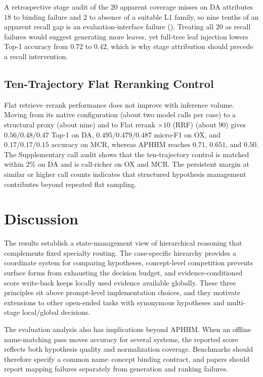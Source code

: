\documentclass[letterpaper]{article} %
\begin{document}
A retrospective stage audit of the $20$ apparent coverage misses on DA attributes $18$ to binding failure and $2$ to absence of a suitable L1 family, so nine tenths of an apparent recall gap is an evaluation-interface failure ().
Treating all $20$ as recall failures would suggest generating more leaves, yet full-tree leaf injection lowers Top-1 accuracy from $0.72$ to $0.42$, which is why stage attribution should precede a recall intervention.

\subsection{Ten-Trajectory Flat Reranking Control}
\label{sec:rq4}

Flat retrieve--rerank performance does not improve with inference volume.
Moving from its native configuration (about two model calls per case) to a structural proxy (about nine) and to Flat rerank $\times 10$ (RRF) (about $90$) gives $0.56/0.48/0.47$ Top-1 on DA, $0.495/0.479/0.487$ micro-F1 on OX, and $0.17/0.17/0.15$ accuracy on MCR, whereas APHHM reaches $0.71$, $0.651$, and $0.50$.
The Supplementary call audit shows that the ten-trajectory control is matched within $2\%$ on DA and is call-richer on OX and MCR.
The persistent margin at similar or higher call counts indicates that structured hypothesis management contributes beyond repeated flat sampling.

\section{Discussion}
\label{sec:discussion}

The results establish a state-management view of hierarchical reasoning that complements fixed specialty routing.
The case-specific hierarchy provides a coordinate system for comparing hypotheses, concept-level competition prevents surface forms from exhausting the decision budget, and evidence-conditioned score write-back keeps locally used evidence available globally.
These three principles sit above prompt-level implementation choices, and they motivate extensions to other open-ended tasks with synonymous hypotheses and multi-stage local/global decisions.

The evaluation analysis also has implications beyond APHHM.
When an offline name-matching pass moves accuracy for several systems, the reported score reflects both hypothesis quality and normalization coverage.
Benchmarks should therefore specify a common name--concept binding contract, and papers should report mapping failures separately from generation and ranking failures.
\end{document}
